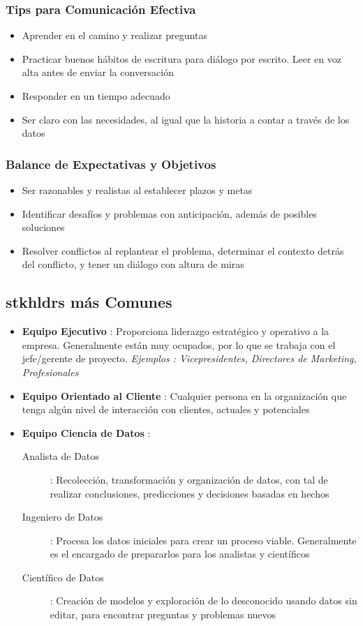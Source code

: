 \subsubsection{Tips para Comunicación Efectiva}
\begin{itemize}
    \item {Aprender en el camino y realizar preguntas}
    \item {Practicar buenos hábitos de escritura para diálogo por escrito. Leer en voz alta antes de enviar la conversación}
    \item {Responder en un tiempo adecuado}
    \item {Ser claro con las necesidades, al igual que la historia a contar a través de los datos}
\end{itemize}

\subsubsection{Balance de Expectativas y Objetivos}
\begin{itemize}
    \item {Ser razonables y realistas al establecer plazos y metas}
    \item {Identificar desafíos y problemas con anticipación, además de posibles soluciones}
    \item {Resolver conflictos al replantear el problema, determinar el contexto detrás del conflicto, y tener un diálogo con altura de miras}
\end{itemize}

\subsection{\gls{stkhldrs} más Comunes}
\begin{itemize}
    \item {\textbf{Equipo Ejecutivo} : Proporciona liderazgo estratégico y operativo a la empresa. Generalmente están muy ocupados, por lo que se trabaja con el jefe/gerente de proyecto. \textit{Ejemplos : Vicepresidentes, Directores de Marketing, Profesionales}}
    \item {\textbf{Equipo Orientado al Cliente} : Cualquier persona en la organización que tenga algún nivel de interacción con clientes, actuales y potenciales}
    \item {\textbf{Equipo Ciencia de Datos} : 
    \begin{description}
        \item[Analista de Datos]{: Recolección, transformación y organización de datos, con tal de realizar conclusiones, predicciones y decisiones basadas en hechos}
        \item[Ingeniero de Datos]{ : Procesa los datos iniciales para crear un proceso viable. Generalmente es el encargado de prepararlos para los analistas y científicos}
        \item[Científico de Datos]{ : Creación de modelos y exploración de lo desconocido usando datos sin editar, para encontrar preguntas y problemas nuevos}
    \end{description}}
\end{itemize}

\newpage